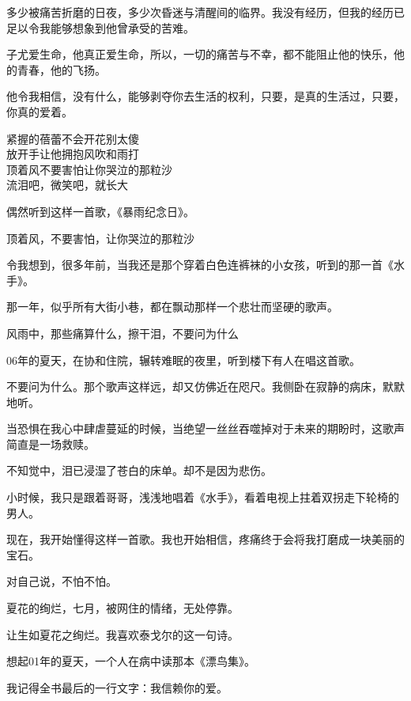 \documentclass[12pt,a4paper]{article}
\def\blankrev{\vspace{1ex}}									%
\begin{document}
		多少被痛苦折磨的日夜，多少次昏迷与清醒间的临界。我没有经历，但我的经历已足以令我能够想象到他曾承受的苦难。

		子尤爱生命，他真正爱生命，所以，一切的痛苦与不幸，都不能阻止他的快乐，他的青春，他的飞扬。

		他令我相信，没有什么，能够剥夺你去生活的权利，只要，是真的生活过，只要，你真的爱着。

	\endwriting



		\longpoem{}{}{}
		紧握的蓓蕾不会开花别太傻 \\
		放开手让他拥抱风吹和雨打 \\
		顶着风不要害怕让你哭泣的那粒沙 \\
		流泪吧，微笑吧，就长大
		\endlongpoem

		偶然听到这样一首歌，《暴雨纪念日》。

		\longpoem{}{}{}
			顶着风，不要害怕，让你哭泣的那粒沙
		\endlongpoem

		令我想到，很多年前，当我还是那个穿着白色连裤袜的小女孩，听到的那一首《水手》。

		那一年，似乎所有大街小巷，都在飘动那样一个悲壮而坚硬的歌声。

		\longpoem{}{}{}
			风雨中，那些痛算什么，擦干泪，不要问为什么
		\endlongpoem

		06年的夏天，在协和住院，辗转难眠的夜里，听到楼下有人在唱这首歌。

		不要问为什么。那个歌声这样远，却又仿佛近在咫尺。我侧卧在寂静的病床，默默地听。

		当恐惧在我心中肆虐蔓延的时候，当绝望一丝丝吞噬掉对于未来的期盼时，这歌声简直是一场救赎。

		不知觉中，泪已浸湿了苍白的床单。却不是因为悲伤。

		小时候，我只是跟着哥哥，浅浅地唱着《水手》，看着电视上拄着双拐走下轮椅的男人。

		现在，我开始懂得这样一首歌。我也开始相信，疼痛终于会将我打磨成一块美丽的宝石。

		对自己说，不怕不怕。

	\endwriting



		夏花的绚烂，七月，被网住的情绪，无处停靠。

		\blankrev
		让生如夏花之绚烂。我喜欢泰戈尔的这一句诗。\par
		想起01年的夏天，一个人在病中读那本《漂鸟集》。\par
		我记得全书最后的一行文字：我信赖你的爱。
\end{document}
